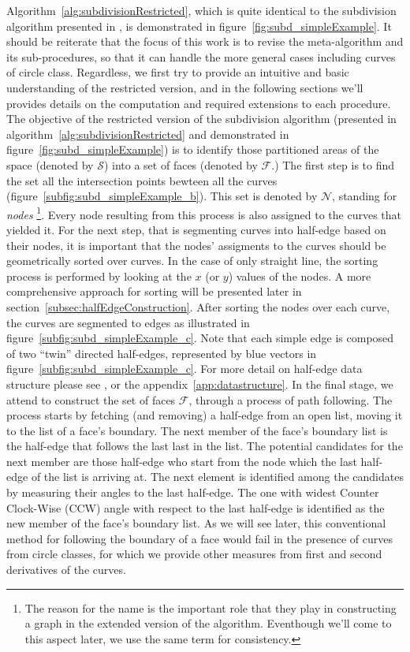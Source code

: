 Algorithm~\ref{alg:subdivisionRestricted}, which is quite identical to the subdivision algorithm presented in \cite{de2000computational}, is demonstrated in figure~\ref{fig:subd_simpleExample}.
It should be reiterate that the focus of this work is to revise the meta-algorithm and its sub-procedures, so that it can handle the more general cases including curves of circle class.
Regardless, we first try to provide an intuitive and basic understanding of the restricted version, and in the following sections we'll provides details on the computation and required extensions to each procedure.
The objective of the restricted version of the subdivision algorithm (presented in algorithm~\ref{alg:subdivisionRestricted} and demonstrated in figure~\ref{fig:subd_simpleExample}) is to identify those partitioned areas of the space (denoted by $\mathcal{S}$) into a set of faces (denoted by $\mathcal{F}$.)
The first step is to find the set all the intersection points bewteen all the curves (figure~\ref{subfig:subd_simpleExample_b}).
This set is denoted by $\mathcal{N}$, standing for \emph{nodes} \footnote{The reason for the name is the important role that they play in constructing a graph in the extended version of the algorithm. Eventhough we'll come to this aspect later, we use the same term for consistency.}.
Every node resulting from this process is also assigned to the curves that yielded it.
For the next step, that is segmenting curves into half-edge based on their nodes, it is important that the nodes' assigments to the curves should be geometrically sorted over curves.
In the case of only straight line, the sorting process is performed by looking at the $x$ (or $y$) values of the nodes.
A more comprehensive approach for sorting will be presented later in section~\ref{subsec:halfEdgeConstruction}.
After sorting the nodes over each curve, the curves are segmented to edges as illustrated in figure~\ref{subfig:subd_simpleExample_c}.
Note that each simple edge is composed of two ``twin'' directed half-edges, represented by blue vectors in figure~\ref{subfig:subd_simpleExample_c}.
For more detail on half-edge data structure please see \cite{de2000computational}, or the appendix~\ref{app:datastructure}.
In the final stage, we attend to construct the set of faces $\mathcal{F}$, through a process of path following.
The process starts by fetching (and removing) a half-edge from an open list, moving it to the list
of a face's boundary.
The next member of the face's boundary list is the half-edge that follows the last last in the list.
The potential candidates for the next member are those half-edge who start from the node which the last half-edge of the list is arriving at.
The next element is identified among the candidates by measuring their angles to the last half-edge.
The one with widest Counter Clock-Wise (CCW) angle with respect to the last half-edge is identified as the new member of the face's boundary list.
As we will see later, this conventional method for following the boundary of a face would fail in the presence of curves from circle classes, for which we provide other measures from first and second derivatives of the curves.

